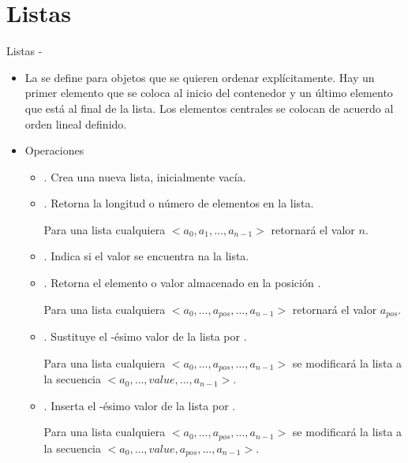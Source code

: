 \documentclass[10pt,envcountsect,spanish]{beamer}
\begin{document}
\section{Listas}

\begin{frame}[allowframebreaks]{Listas -}

\begin{itemize}
\item La  se define para objetos que se quieren ordenar explícitamente. Hay un primer elemento que se coloca al inicio del contenedor y un último elemento que  está al final de la lista. Los elementos centrales se colocan de acuerdo al orden lineal definido.

\item Operaciones
\begin{itemize}
\item {}. Crea una nueva lista, inicialmente vacía.


\item {}. Retorna la longitud o número de elementos en la lista.

Para una lista cualquiera $<a_0, a_1, \ldots, a_{n-1}>$ retornará el valor $n$.

\item {}. Indica si el valor  se encuentra na la lista.


\item {}. Retorna el elemento o valor almacenado en la posición . 

Para una lista cualquiera $<a_0, \ldots, a_{pos}, \ldots, a_{n-1}>$ retornará el valor $a_{pos}$.


\item {}. Sustituye el -ésimo valor de la lista por . 

Para una lista cualquiera $<a_0, \ldots, a_{pos}, \ldots, a_{n-1}>$ se modificará la lista a la secuencia $<a_0, \ldots, value, \ldots, a_{n-1}>$.

\item {}. Inserta el  -ésimo valor de la lista por . 

Para una lista cualquiera $<a_0, \ldots, a_{pos}, \ldots, a_{n-1}>$ se modificará la lista a la secuencia $<a_0, \ldots, value, a_{pos}, \ldots, a_{n-1}>$.



\end{itemize}
\end{itemize}
\end{frame}
\end{document}
